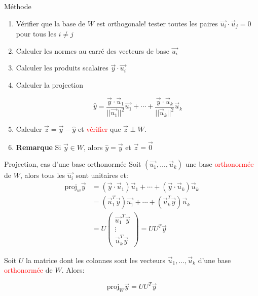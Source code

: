 \begin{parag}{Méthode}
    \begin{enumerate}
        \item Vérifier que la base de $W$ est orthogonale! tester toutes les paires $\vec{u_i}\cdot\vec{u}_j = 0$ pour tous les $i \neq j$
        \item Calculer les normes au carré des vecteurs de base $\vec{u_i}$
        \item Calculer les produits scalaires $\vec{y}\cdot\vec{u_i}$
        \item Calculer la projection
        \begin{formule}
            \[\hat{y} = \frac{\vec{y}\cdot \vec{u}_1}{||\vec{u_1}||^2}\vec{u_1} + \cdots + \frac{\vec{y}\cdot\vec{u}_k}{||\vec{u}_k||^2}\vec{u}_k\]
        \end{formule}
        \item Calculer $\vec{z} = \vec{y}-\hat{y}$ et \textcolor{red}{vérifier} que $\vec{z}\perp W$.
        \item \textbf{Remarque} Si $\vec{y} \in W$, alors $\hat{y} = \vec{y}$ et $\vec{z} = \vec{0}$
    \end{enumerate}
\end{parag}
\begin{parag}{Projection, cas d'une base orthonormée}
    Soit $(\vec{u_1}, \dots, \vec{u}_k)$ une base \textcolor{red}{orthonormée} de $W$, alors tous les $\vec{u_i}$ sont unitaires et:
    \begin{align*}
        \text{proj}_w\vec{y} &= (\vec{y}\cdot\vec{u}_1)\vec{u}_1 + \cdots +(\vec{y}\cdot\vec{u}_k)\vec{u}_k\\
        &= (\vec{u}_1^T\vec{y})\vec{u_1} + \cdots + (\vec{u}_k^T\vec{y})\vec{u}_k\\
        &= U\begin{pmatrix}
            \vec{u_1}^T\vec{y}\\
            \vdots\\
            \vec{u}_k^T\vec{y}
        \end{pmatrix} = UU^T\vec{y}
    \end{align*}

    \begin{theoreme}
        Soit $U$ la matrice dont les colonnes sont les vecteurs $\vec{u}_1, \dots, \vec{u}_k$ d'une base \textcolor{red}{orthonormée} de $W$. Alors:

        \begin{formule}
            \[\text{proj}_W\vec{y} = UU^T\vec{y}\]
        \end{formule}
    \end{theoreme}
\end{parag}
